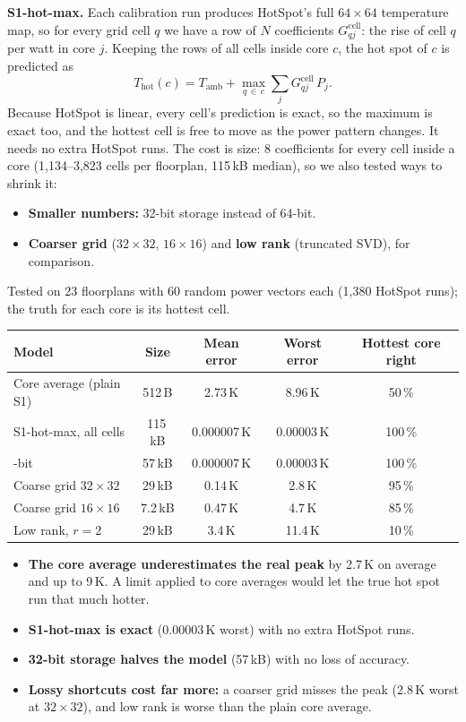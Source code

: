 \documentclass[11pt,a4paper]{article}
\begin{document}
\textbf{S1-hot-max.} Each calibration run produces HotSpot's full $64\times64$ temperature map,
so for every grid cell $q$ we have a row of $N$ coefficients $G^\text{cell}_{qj}$: the rise of
cell $q$ per watt in core $j$. Keeping the rows of all cells inside core $c$, the hot spot of $c$
is predicted as
\[ T_\text{hot}(c) = T_\text{amb} + \max_{q\,\in\,c} \sum_j G^\text{cell}_{qj}\,P_j . \]
Because HotSpot is linear, every cell's prediction is exact, so the maximum is exact too, and the
hottest cell is free to move as the power pattern changes. It needs no extra HotSpot runs. The
cost is size: 8 coefficients for every cell inside a core (1{,}134--3{,}823 cells per floorplan,
115\,kB median), so we also tested ways to shrink it:
\begin{itemize}
  \item \textbf{Smaller numbers:} 32-bit storage instead of 64-bit.
  \item \textbf{Coarser grid} ($32\times32$, $16\times16$) and \textbf{low rank} (truncated SVD),
        for comparison.
\end{itemize}
Tested on 23 floorplans with 60 random power vectors each (1{,}380 HotSpot runs); the truth for
each core is its hottest cell.

\begin{center}
\small
\begin{tabular}{@{}l c c c c@{}}
\toprule
Model & Size & Mean error & Worst error & Hottest core right \\
\midrule
Core average (plain S1) & 512\,B & 2.73\,K & 8.96\,K & 50\,\% \\
S1-hot-max, all cells & 115\,kB & 0.000007\,K & 0.00003\,K & 100\,\% \\
\quad 32-bit & 57\,kB & 0.000007\,K & 0.00003\,K & 100\,\% \\
Coarse grid $32\times32$ & 29\,kB & 0.14\,K & 2.8\,K & 95\,\% \\
Coarse grid $16\times16$ & 7.2\,kB & 0.47\,K & 4.7\,K & 85\,\% \\
Low rank, $r=2$ & 29\,kB & 3.4\,K & 11.4\,K & 10\,\% \\
\bottomrule
\end{tabular}
\end{center}

\begin{itemize}
  \item \textbf{The core average underestimates the real peak} by 2.7\,K on average and up to
        9\,K. A limit applied to core averages would let the true hot spot run that much hotter.
  \item \textbf{S1-hot-max is exact} (0.00003\,K worst) with no extra HotSpot runs.
  \item \textbf{32-bit storage halves the model} (57\,kB) with no loss of accuracy.
  \item \textbf{Lossy shortcuts cost far more:} a coarser grid misses the peak (2.8\,K worst at
        $32\times32$), and low rank is worse than the plain core average.
\end{itemize}
\end{document}
